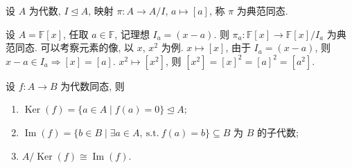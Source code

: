 \begin{definition}[典范同态]\label{def:canonical-hom}
设 $A$ 为代数, $I\trianglelefteq A$, 映射 $\pi\colon A\to A/I$, $a\mapsto[a]$, 称 $\pi$ 为典范同态.
\end{definition}

\begin{example}\label{ex:poly-quotient-evaluation}
设 $A=\mathbb{F}[x]$, 任取 $a\in \mathbb{F}$, 记理想 $I_a=(x-a)$.
则 $\pi_a\colon \mathbb{F}[x]\to \mathbb{F}[x]/I_a$ 为典范同态.
可以考察元素的像, 以 $x$, $x^2$ 为例.
$x\mapsto[x]$, 由于 $I_a=(x-a)$, 则 $x-a\in I_a\Rightarrow[x]=[a]$.
$x^2\mapsto[x^2]$, 则 $[x^2]=[x]^2=[a]^2=[a^2]$.
\end{example}

\begin{theorem}[同态基本定理]\label{thm:first-iso}
设 $f\colon A\to B$ 为代数同态, 则
\begin{enumerate}
  \item $\operatorname{Ker}(f)=\{a\in A\mid f(a)=0\}\trianglelefteq A$;
  \item $\operatorname{Im}(f)=\{b\in B\mid\exists a\in A,\ \text{s.t.}\ f(a)=b\}\subseteq B$
  为 $B$ 的子代数;
  \item $A/\operatorname{Ker}(f)\cong\operatorname{Im}(f)$.
\end{enumerate}
\end{theorem}

